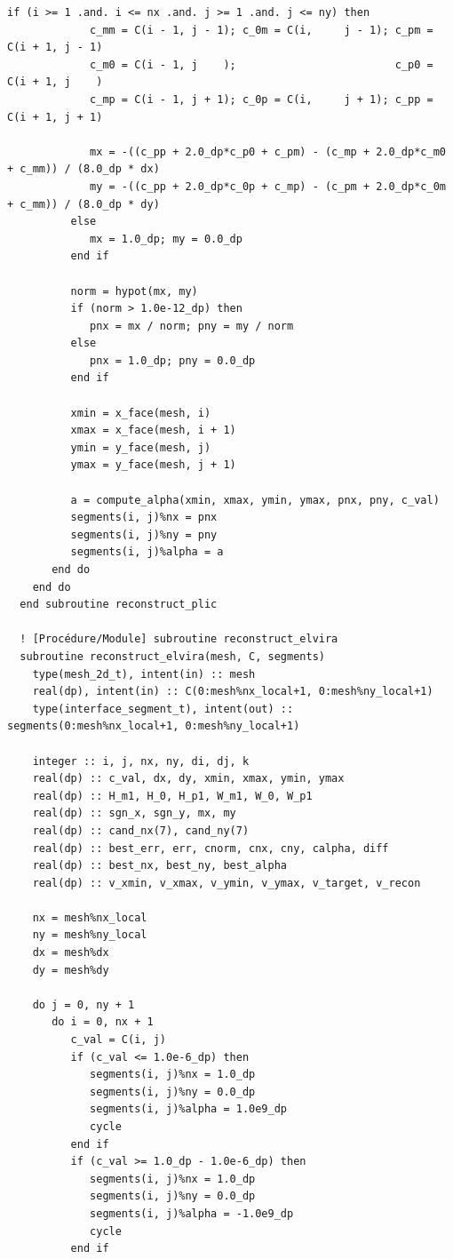 \documentclass[10pt,a4paper,oneside]{book}
\begin{document}
\begin{lstlisting}[language={[95]Fortran}]
          if (i >= 1 .and. i <= nx .and. j >= 1 .and. j <= ny) then
             c_mm = C(i - 1, j - 1); c_0m = C(i,     j - 1); c_pm = C(i + 1, j - 1)
             c_m0 = C(i - 1, j    );                         c_p0 = C(i + 1, j    )
             c_mp = C(i - 1, j + 1); c_0p = C(i,     j + 1); c_pp = C(i + 1, j + 1)

             mx = -((c_pp + 2.0_dp*c_p0 + c_pm) - (c_mp + 2.0_dp*c_m0 + c_mm)) / (8.0_dp * dx)
             my = -((c_pp + 2.0_dp*c_0p + c_mp) - (c_pm + 2.0_dp*c_0m + c_mm)) / (8.0_dp * dy)
          else
             mx = 1.0_dp; my = 0.0_dp
          end if

          norm = hypot(mx, my)
          if (norm > 1.0e-12_dp) then
             pnx = mx / norm; pny = my / norm
          else
             pnx = 1.0_dp; pny = 0.0_dp
          end if

          xmin = x_face(mesh, i)
          xmax = x_face(mesh, i + 1)
          ymin = y_face(mesh, j)
          ymax = y_face(mesh, j + 1)

          a = compute_alpha(xmin, xmax, ymin, ymax, pnx, pny, c_val)
          segments(i, j)%nx = pnx
          segments(i, j)%ny = pny
          segments(i, j)%alpha = a
       end do
    end do
  end subroutine reconstruct_plic

  ! [Procédure/Module] subroutine reconstruct_elvira
  subroutine reconstruct_elvira(mesh, C, segments)
    type(mesh_2d_t), intent(in) :: mesh
    real(dp), intent(in) :: C(0:mesh%nx_local+1, 0:mesh%ny_local+1)
    type(interface_segment_t), intent(out) :: segments(0:mesh%nx_local+1, 0:mesh%ny_local+1)

    integer :: i, j, nx, ny, di, dj, k
    real(dp) :: c_val, dx, dy, xmin, xmax, ymin, ymax
    real(dp) :: H_m1, H_0, H_p1, W_m1, W_0, W_p1
    real(dp) :: sgn_x, sgn_y, mx, my
    real(dp) :: cand_nx(7), cand_ny(7)
    real(dp) :: best_err, err, cnorm, cnx, cny, calpha, diff
    real(dp) :: best_nx, best_ny, best_alpha
    real(dp) :: v_xmin, v_xmax, v_ymin, v_ymax, v_target, v_recon

    nx = mesh%nx_local
    ny = mesh%ny_local
    dx = mesh%dx
    dy = mesh%dy

    do j = 0, ny + 1
       do i = 0, nx + 1
          c_val = C(i, j)
          if (c_val <= 1.0e-6_dp) then
             segments(i, j)%nx = 1.0_dp
             segments(i, j)%ny = 0.0_dp
             segments(i, j)%alpha = 1.0e9_dp
             cycle
          end if
          if (c_val >= 1.0_dp - 1.0e-6_dp) then
             segments(i, j)%nx = 1.0_dp
             segments(i, j)%ny = 0.0_dp
             segments(i, j)%alpha = -1.0e9_dp
             cycle
          end if


\end{lstlisting}
\end{document}

